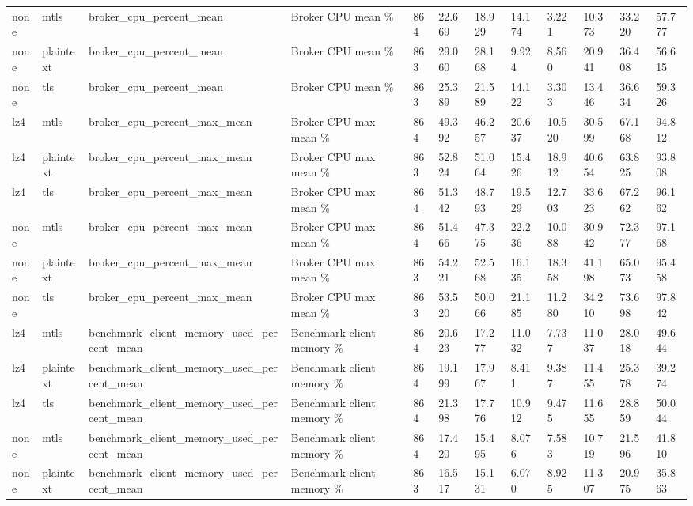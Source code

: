 \begin{longtable}{llllllllllll}
none & mtls & broker\_cpu\_percent\_mean & Broker CPU mean \% & 864 & 22.669 & 18.929 & 14.174 & 3.221 & 10.373 & 33.220 & 57.777 \\
none & plaintext & broker\_cpu\_percent\_mean & Broker CPU mean \% & 863 & 29.060 & 28.168 & 9.924 & 8.560 & 20.941 & 36.408 & 56.615 \\
none & tls & broker\_cpu\_percent\_mean & Broker CPU mean \% & 863 & 25.389 & 21.589 & 14.122 & 3.303 & 13.446 & 36.634 & 59.326 \\
lz4 & mtls & broker\_cpu\_percent\_max\_mean & Broker CPU max mean \% & 864 & 49.392 & 46.257 & 20.637 & 10.520 & 30.599 & 67.168 & 94.812 \\
lz4 & plaintext & broker\_cpu\_percent\_max\_mean & Broker CPU max mean \% & 863 & 52.824 & 51.064 & 15.426 & 18.912 & 40.654 & 63.825 & 93.808 \\
lz4 & tls & broker\_cpu\_percent\_max\_mean & Broker CPU max mean \% & 864 & 51.342 & 48.793 & 19.529 & 12.703 & 33.623 & 67.262 & 96.162 \\
none & mtls & broker\_cpu\_percent\_max\_mean & Broker CPU max mean \% & 864 & 51.466 & 47.375 & 22.236 & 10.088 & 30.942 & 72.377 & 97.168 \\
none & plaintext & broker\_cpu\_percent\_max\_mean & Broker CPU max mean \% & 863 & 54.221 & 52.568 & 16.135 & 18.358 & 41.198 & 65.073 & 95.458 \\
none & tls & broker\_cpu\_percent\_max\_mean & Broker CPU max mean \% & 863 & 53.520 & 50.066 & 21.185 & 11.280 & 34.210 & 73.698 & 97.842 \\
lz4 & mtls & benchmark\_client\_memory\_used\_percent\_mean & Benchmark client memory \% & 864 & 20.623 & 17.277 & 11.032 & 7.737 & 11.037 & 28.018 & 49.644 \\
lz4 & plaintext & benchmark\_client\_memory\_used\_percent\_mean & Benchmark client memory \% & 864 & 19.199 & 17.967 & 8.411 & 9.387 & 11.455 & 25.378 & 39.274 \\
lz4 & tls & benchmark\_client\_memory\_used\_percent\_mean & Benchmark client memory \% & 864 & 21.398 & 17.776 & 10.912 & 9.475 & 11.655 & 28.859 & 50.044 \\
none & mtls & benchmark\_client\_memory\_used\_percent\_mean & Benchmark client memory \% & 864 & 17.420 & 15.495 & 8.076 & 7.583 & 10.719 & 21.596 & 41.810 \\
none & plaintext & benchmark\_client\_memory\_used\_percent\_mean & Benchmark client memory \% & 863 & 16.517 & 15.131 & 6.070 & 8.925 & 11.307 & 20.975 & 35.863 \\

\end{longtable}
